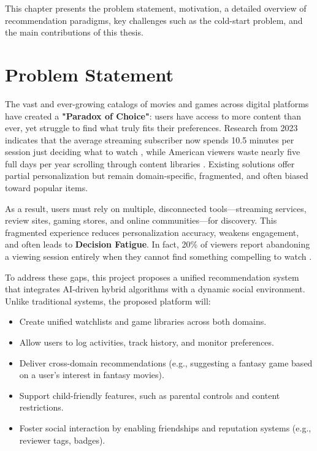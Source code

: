 This chapter presents the problem statement, motivation, a detailed overview of recommendation paradigms, key challenges such as the cold-start problem, and the main contributions of this thesis.

\section{Problem Statement}

The vast and ever-growing catalogs of movies and games across digital platforms have created a \textbf{"Paradox of Choice"}: users have access to more content than ever, yet struggle to find what truly fits their preferences. Research from 2023 indicates that the average streaming subscriber now spends 10.5 minutes per session just deciding what to watch \cite{nielsen2023}, while American viewers waste nearly five full days per year scrolling through content libraries \cite{usertesting2023}. Existing solutions offer partial personalization but remain domain-specific, fragmented, and often biased toward popular items.

As a result, users must rely on multiple, disconnected tools—streaming services, review sites, gaming stores, and online communities—for discovery. This fragmented experience reduces personalization accuracy, weakens engagement, and often leads to \textbf{Decision Fatigue}. In fact, 20\% of viewers report abandoning a viewing session entirely when they cannot find something compelling to watch \cite{nielsen2023}.

To address these gaps, this project proposes a unified recommendation system that integrates AI-driven hybrid algorithms with a dynamic social environment. Unlike traditional systems, the proposed platform will:
\begin{itemize}
    \item Create unified watchlists and game libraries across both domains.
    \item Allow users to log activities, track history, and monitor preferences.
    \item Deliver cross-domain recommendations (e.g., suggesting a fantasy game based on a user’s interest in fantasy movies).
    \item Support child-friendly features, such as parental controls and content restrictions.
    \item Foster social interaction by enabling friendships and reputation systems (e.g., reviewer tags, badges).
\end{itemize}

